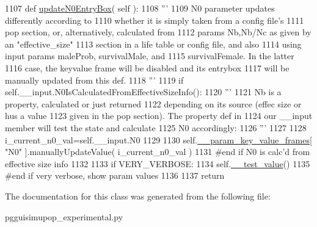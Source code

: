 \begin{DoxyCode}
1107     \textcolor{keyword}{def }\hyperlink{classnegui_1_1pgguisimupop__experimental_1_1PGGuiSimuPop_a8e44626bb0deceea22ca871d49dc0de5}{updateN0EntryBox}( self ):
1108         \textcolor{stringliteral}{'''}
1109 \textcolor{stringliteral}{        N0 parameter updates differently according to}
1110 \textcolor{stringliteral}{        whether it is simply taken from a config file's}
1111 \textcolor{stringliteral}{        pop section, or, alternatively, calculated from}
1112 \textcolor{stringliteral}{        params Nb,Nb/Nc as given by an "effective\_size"}
1113 \textcolor{stringliteral}{        section in a life table or config file, and also}
1114 \textcolor{stringliteral}{        using input params maleProb, survivalMale, and}
1115 \textcolor{stringliteral}{        survivalFemale.  In the latter}
1116 \textcolor{stringliteral}{        case, the keyvalue frame will be disabled and its entrybox}
1117 \textcolor{stringliteral}{        will be manually updated from this def.  }
1118 \textcolor{stringliteral}{        '''}
1119         \textcolor{keywordflow}{if} self.\_\_input.N0IsCalculatedFromEffectiveSizeInfo():
1120             \textcolor{stringliteral}{'''}
1121 \textcolor{stringliteral}{            Nb is a property, calculated or just returned}
1122 \textcolor{stringliteral}{            depending on its source (effec size or hus a value}
1123 \textcolor{stringliteral}{            given in the pop section). The property def in}
1124 \textcolor{stringliteral}{            our \_\_input member will test the state and calculate}
1125 \textcolor{stringliteral}{            N0 accordingly:}
1126 \textcolor{stringliteral}{            '''}
1127 
1128             i\_current\_n0\_val=self.\_\_input.N0
1129 
1130             self.\hyperlink{classnegui_1_1pgguisimupop__experimental_1_1PGGuiSimuPop_ad95dc47c19913b4eb1a4151af1e5879d}{\_\_param\_key\_value\_frames}[ \textcolor{stringliteral}{"N0"} ].manuallyUpdateValue( 
      i\_current\_n0\_val )
1131         \textcolor{comment}{#end if N0 is calc'd from effective size info}
1132 
1133         \textcolor{keywordflow}{if} VERY\_VERBOSE:
1134             self.\hyperlink{classnegui_1_1pgguisimupop__experimental_1_1PGGuiSimuPop_a596d62c8c6ecf9155925d8b1aafde2af}{\_\_test\_value}()
1135         \textcolor{comment}{#end if very verbose, show param values}
1136 
1137         \textcolor{keywordflow}{return}
\end{DoxyCode}


The documentation for this class was generated from the following file\+:\begin{DoxyCompactItemize}
\item 
pgguisimupop\+\_\+experimental.\+py\end{DoxyCompactItemize}
